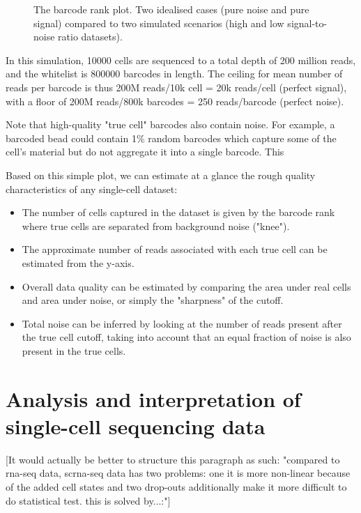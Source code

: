 \begin{figure}[h]
	\centering
	\resizebox{0.8\textwidth}{!}{}
	\captionsetup{width=0.85\linewidth}
	\caption[Barcode rank simulation]{The barcode rank plot. Two idealised cases (pure noise and pure signal) compared to two simulated  scenarios (high and low signal-to-noise ratio datasets).}
	\label{fig:kneeplot}
\end{figure}

In this simulation, \num{10000} cells are sequenced to a total depth of 200 million reads, and the whitelist is \num{800000} barcodes in length. The ceiling for mean number of reads per barcode is thus 200M reads/10k cell = 20k reads/cell (perfect signal), with a floor of 200M reads/800k barcodes = 250 reads/barcode (perfect noise).

Note that high-quality "true cell" barcodes also contain noise. For example, a barcoded bead could contain 1\% random barcodes which capture some of the cell's material but do not aggregate it into a single barcode. This

Based on this simple plot, we can estimate at a glance the rough quality characteristics of any single-cell dataset:

\begin{itemize}[noitemsep]
	\item The number of cells captured in the dataset is given by the barcode rank where true cells are separated from background noise ("knee").
	\item The approximate number of reads associated with each true cell can be estimated from the y-axis.
	\item Overall data quality can be estimated by comparing the area under real cells and area under noise, or simply the "sharpness" of the cutoff.
	\item Total noise can be inferred by looking at the number of reads present after the true cell cutoff, taking into account that an equal fraction of noise is also present in the true cells.
\end{itemize}

\section{Analysis and interpretation of single-cell sequencing data}
 [It would actually be better to structure this paragraph as such: "compared to rna-seq data, scrna-seq data has two problems: one it is more non-linear because of the added cell states and two drop-outs additionally make it more difficult to do statistical test. this is solved by...:"]

